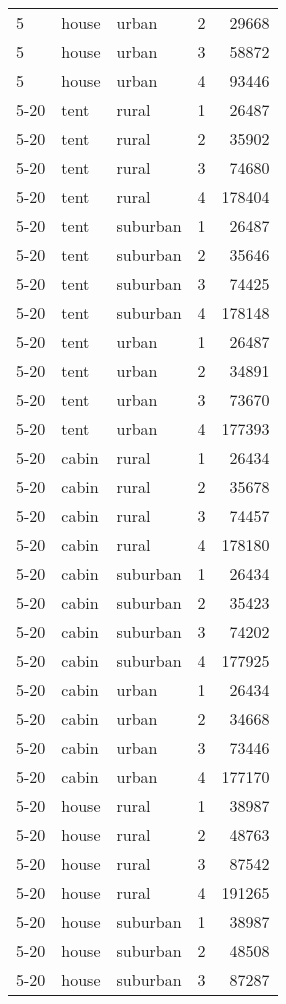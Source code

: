 \begin{center}
\begin{longtable}{llllr}
5 & house & urban & 2 & 29668 \\
5 & house & urban & 3 & 58872 \\
5 & house & urban & 4 & 93446 \\
5-20 & tent & rural & 1 & 26487 \\
5-20 & tent & rural & 2 & 35902 \\
5-20 & tent & rural & 3 & 74680 \\
5-20 & tent & rural & 4 & 178404 \\
5-20 & tent & suburban & 1 & 26487 \\
5-20 & tent & suburban & 2 & 35646 \\
5-20 & tent & suburban & 3 & 74425 \\
5-20 & tent & suburban & 4 & 178148 \\
5-20 & tent & urban & 1 & 26487 \\
5-20 & tent & urban & 2 & 34891 \\
5-20 & tent & urban & 3 & 73670 \\
5-20 & tent & urban & 4 & 177393 \\
5-20 & cabin & rural & 1 & 26434 \\
5-20 & cabin & rural & 2 & 35678 \\
5-20 & cabin & rural & 3 & 74457 \\
5-20 & cabin & rural & 4 & 178180 \\
5-20 & cabin & suburban & 1 & 26434 \\
5-20 & cabin & suburban & 2 & 35423 \\
5-20 & cabin & suburban & 3 & 74202 \\
5-20 & cabin & suburban & 4 & 177925 \\
5-20 & cabin & urban & 1 & 26434 \\
5-20 & cabin & urban & 2 & 34668 \\
5-20 & cabin & urban & 3 & 73446 \\
5-20 & cabin & urban & 4 & 177170 \\
5-20 & house & rural & 1 & 38987 \\
5-20 & house & rural & 2 & 48763 \\
5-20 & house & rural & 3 & 87542 \\
5-20 & house & rural & 4 & 191265 \\
5-20 & house & suburban & 1 & 38987 \\
5-20 & house & suburban & 2 & 48508 \\
5-20 & house & suburban & 3 & 87287 \\

\end{longtable}
\end{center}
